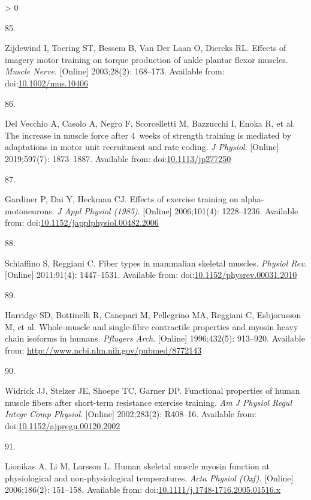 \documentclass[twoside,10pt]{gihclass} %
\newlength{\cslhangindent}
\newlength{\csllabelwidth}
\newenvironment{CSLReferences}[3] %
 {%
  \setlength{\parindent}{0pt}
  \ifodd #1 \everypar{\setlength{\hangindent}{\cslhangindent}}\ignorespaces\fi
  \ifnum #2 > 0
  \setlength{\parskip}{#2\baselineskip}
  \fi
 }%
 {}
\newcommand{\CSLLeftMargin}[1]{\parbox[t]{\maxof{\widthof{#1}}{\csllabelwidth}}{#1}}
\newcommand{\CSLRightInline}[1]{\parbox[t]{\linewidth}{#1}}
\begin{document}
\begin{CSLReferences}{0}{0}
\leavevmode\hypertarget{ref-RN2767}{}%
\CSLLeftMargin{85. }
\CSLRightInline{Zijdewind I, Toering ST, Bessem B, Van Der Laan O, Diercks RL. Effects of imagery motor training on torque production of ankle plantar flexor muscles. \emph{Muscle Nerve}. {[}Online{]} 2003;28(2): 168--173. Available from: doi:\href{https://doi.org/10.1002/mus.10406}{10.1002/mus.10406}}

\leavevmode\hypertarget{ref-RN2763}{}%
\CSLLeftMargin{86. }
\CSLRightInline{Del Vecchio A, Casolo A, Negro F, Scorcelletti M, Bazzucchi I, Enoka R, et al. The increase in muscle force after 4~weeks of strength training is mediated by adaptations in motor unit recruitment and rate coding. \emph{J Physiol}. {[}Online{]} 2019;597(7): 1873--1887. Available from: doi:\href{https://doi.org/10.1113/jp277250}{10.1113/jp277250}}

\leavevmode\hypertarget{ref-RN2764}{}%
\CSLLeftMargin{87. }
\CSLRightInline{Gardiner P, Dai Y, Heckman CJ. Effects of exercise training on alpha-motoneurons. \emph{J Appl Physiol (1985)}. {[}Online{]} 2006;101(4): 1228--1236. Available from: doi:\href{https://doi.org/10.1152/japplphysiol.00482.2006}{10.1152/japplphysiol.00482.2006}}

\leavevmode\hypertarget{ref-RN819}{}%
\CSLLeftMargin{88. }
\CSLRightInline{Schiaffino S, Reggiani C. Fiber types in mammalian skeletal muscles. \emph{Physiol Rev}. {[}Online{]} 2011;91(4): 1447--1531. Available from: doi:\href{https://doi.org/10.1152/physrev.00031.2010}{10.1152/physrev.00031.2010}}

\leavevmode\hypertarget{ref-RN846}{}%
\CSLLeftMargin{89. }
\CSLRightInline{Harridge SD, Bottinelli R, Canepari M, Pellegrino MA, Reggiani C, Esbjornsson M, et al. Whole-muscle and single-fibre contractile properties and myosin heavy chain isoforms in humans. \emph{Pflugers Arch}. {[}Online{]} 1996;432(5): 913--920. Available from: \url{http://www.ncbi.nlm.nih.gov/pubmed/8772143}}

\leavevmode\hypertarget{ref-RN2169}{}%
\CSLLeftMargin{90. }
\CSLRightInline{Widrick JJ, Stelzer JE, Shoepe TC, Garner DP. Functional properties of human muscle fibers after short-term resistance exercise training. \emph{Am J Physiol Regul Integr Comp Physiol}. {[}Online{]} 2002;283(2): R408--16. Available from: doi:\href{https://doi.org/10.1152/ajpregu.00120.2002}{10.1152/ajpregu.00120.2002}}

\leavevmode\hypertarget{ref-RN849}{}%
\CSLLeftMargin{91. }
\CSLRightInline{Lionikas A, Li M, Larsson L. Human skeletal muscle myosin function at physiological and non-physiological temperatures. \emph{Acta Physiol (Oxf)}. {[}Online{]} 2006;186(2): 151--158. Available from: doi:\href{https://doi.org/10.1111/j.1748-1716.2005.01516.x}{10.1111/j.1748-1716.2005.01516.x}}


\end{CSLReferences}
\end{document}
